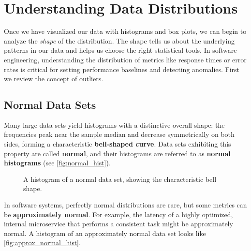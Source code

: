 \section{Understanding Data Distributions} \label{sec:data_distributions}
Once we have visualized our data with histograms and box plots, we can begin to analyze the \textit{shape} of the distribution. The shape tells us about the underlying patterns in our data and helps us choose the right statistical tools. In software engineering, understanding the distribution of metrics like response times or error rates is critical for setting performance baselines and detecting anomalies. First we review the concept of outliers.

\subsection*{Normal Data Sets}

Many large data sets yield histograms with a distinctive overall shape: the frequencies peak near the sample median and decrease symmetrically on both sides, forming a characteristic \textbf{bell-shaped curve}. Data sets exhibiting this property are called \textbf{normal}, and their histograms are referred to as \textbf{normal histograms} (see \autoref{fig:normal_hist}).

\begin{figure}[htbp]
    \centering
    \caption{A histogram of a normal data set, showing the characteristic bell shape.}
    \label{fig:normal_hist}
\end{figure}


In software systems, perfectly normal distributions are rare, but some metrics can be \textbf{approximately normal}. For example, the latency of a highly optimized, internal microservice that performs a consistent task might be approximately normal. A histogram of an approximately normal data set looks like \autoref{fig:approx_normal_hist}.

